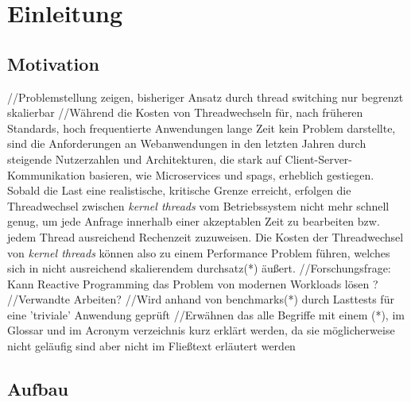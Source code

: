 \section{Einleitung}
\label{sec:einleitung}

\subsection{Motivation}
\label{subsec:motivation}
//Problemstellung zeigen, bisheriger Ansatz durch thread switching nur begrenzt skalierbar
//Während die Kosten von Threadwechseln für, nach früheren Standards, hoch frequentierte Anwendungen lange Zeit kein Problem darstellte,
sind die Anforderungen an Webanwendungen in den letzten Jahren durch steigende Nutzerzahlen und Architekturen,
die stark auf Client-Server-Kommunikation basieren, wie Microservices und \Glspl{spag}, erheblich gestiegen.
\noindent
Sobald die Last eine realistische, kritische Grenze erreicht, erfolgen die Threadwechsel zwischen \textit{kernel threads} vom Betriebssystem
nicht mehr schnell genug, um jede Anfrage innerhalb einer akzeptablen Zeit zu bearbeiten bzw. jedem Thread ausreichend Rechenzeit zuzuweisen.
Die Kosten der Threadwechsel von \textit{kernel threads} können also zu einem Performance Problem führen, welches sich in nicht
ausreichend skalierendem \Gls{durchsatz}(*) äußert.
//Forschungsfrage: Kann Reactive Programming das Problem von modernen Workloads lösen ?
//Verwandte Arbeiten?
//Wird anhand  von \Glspl{benchmark}(*) durch Lasttests für eine 'triviale' Anwendung geprüft
//Erwähnen das alle Begriffe mit einem (*), im Glossar und im Acronym verzeichnis kurz erklärt werden, da sie möglicherweise nicht geläufig sind aber
nicht im Fließtext erläutert werden
\subsection{Aufbau}
\label{subsec:aufbau}